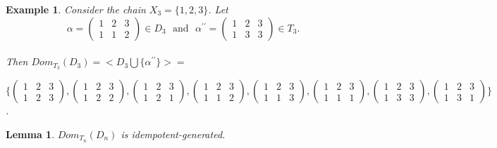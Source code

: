 \documentclass[10pt]{extarticle}
\numberwithin{equation}{section}
\numberwithin{bbb}{section}
\newtheorem{lemma}{Lemma}[section]
\newtheorem{example}[theorem]{Example}
\numberwithin{equation}{section}
\begin{document}
\vspace{0.3cm}
\begin{example}
Consider the chain $X_3=\{1,2,3\}$. Let
$$\alpha=\begin{pmatrix}  1&2&3\\1&1&2
\end{pmatrix}\in D_3 \ \ \ \text{and} \ \ \ \alpha^{\prime\prime}=\begin{pmatrix}  1&2&3\\1&3&3
\end{pmatrix}\in T_3.$$\\[10pt]
Then $Dom_{T_3}(D_3)=<D_3 \bigcup \{{\alpha^{\prime\prime}}\}>=$  

\vspace{0.5cm}
$\Bigg\{
   \begin{pmatrix}  1&2&3\\1&2&3
\end{pmatrix}, 
\begin{pmatrix}  1&2&3\\1&2&2
\end{pmatrix},
\begin{pmatrix}  1&2&3\\1&2&1
\end{pmatrix},
\begin{pmatrix}  1&2&3\\1&1&2
\end{pmatrix},
\begin{pmatrix}  1&2&3\\1&1&3
\end{pmatrix},
\begin{pmatrix}  1&2&3\\1&1&1
\end{pmatrix},
\begin{pmatrix}  1&2&3\\1&3&3
\end{pmatrix},
\begin{pmatrix}  1&2&3\\1&3&1
\end{pmatrix}
\Bigg\}$.
\end{example}

\vspace{0.5cm}
\begin{lemma}  
$Dom_{T_n}(D_n)$ is idempotent-generated.
\end{lemma}
\end{document}
